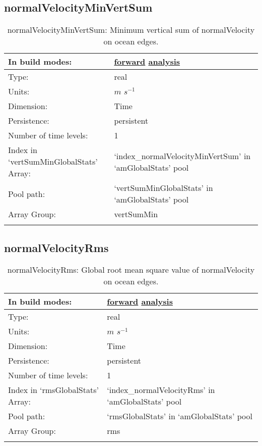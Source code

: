 \subsection[normalVelocityMinVertSum]{normalVelocityMinVertSum}
\label{subsec:var_sec_amGlobalStats_normalVelocityMinVertSum}
\begin{center}
\begin{longtable}{| p{2.0in} | p{4.0in} |}
        \hline 
        In build modes: & \hyperref[subsec:forward_var_tab_amGlobalStats]{forward} \hyperref[subsec:analysis_var_tab_amGlobalStats]{analysis} \\
        \hline 
        Type: & real \\
        \hline 
        Units: & $m$ $s^{-1}$ \\
        \hline 
        Dimension: & Time \\
        \hline 
        Persistence: & persistent \\
        \hline 
        Number of time levels: & 1 \\
        \hline 
		 Index in `vertSumMinGlobalStats' Array: & `index\_normalVelocityMinVertSum' in `amGlobalStats' pool \\
		 \hline 
            Pool path: & `vertSumMinGlobalStats' in `amGlobalStats' pool \\
		 \hline 
		 Array Group: & vertSumMin \\
		 \hline 
    \caption{normalVelocityMinVertSum: Minimum vertical sum of normalVelocity on ocean edges.}
\end{longtable}
\end{center}
\subsection[normalVelocityRms]{normalVelocityRms}
\label{subsec:var_sec_amGlobalStats_normalVelocityRms}
\begin{center}
\begin{longtable}{| p{2.0in} | p{4.0in} |}
        \hline 
        In build modes: & \hyperref[subsec:forward_var_tab_amGlobalStats]{forward} \hyperref[subsec:analysis_var_tab_amGlobalStats]{analysis} \\
        \hline 
        Type: & real \\
        \hline 
        Units: & $m$ $s^{-1}$ \\
        \hline 
        Dimension: & Time \\
        \hline 
        Persistence: & persistent \\
        \hline 
        Number of time levels: & 1 \\
        \hline 
		 Index in `rmsGlobalStats' Array: & `index\_normalVelocityRms' in `amGlobalStats' pool \\
		 \hline 
            Pool path: & `rmsGlobalStats' in `amGlobalStats' pool \\
		 \hline 
		 Array Group: & rms \\
		 \hline 
    \caption{normalVelocityRms: Global root mean square value of normalVelocity on ocean edges.}
\end{longtable}
\end{center}
